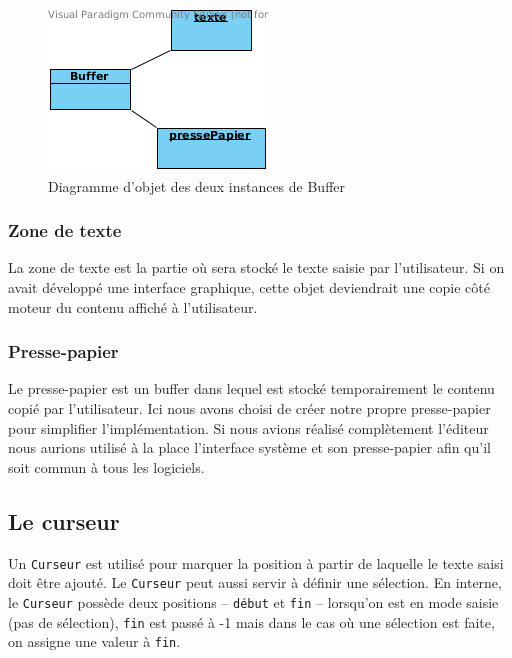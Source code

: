 \documentclass[french]{article}
\begin{document}
\begin{figure}[h!]
	\centering
	\includegraphics{buffer-texte-clipboard.png}
	\caption{Diagramme d'objet des deux instances de Buffer}
\end{figure}

\subsubsection{Zone de texte}\label{ssec:zone-texte}

La zone de texte est la partie où sera stocké le texte saisie par l'utilisateur. Si on avait développé une interface graphique, cette objet deviendrait une copie côté moteur du contenu affiché à l'utilisateur.

\subsubsection{Presse-papier}\label{ssec:presse-papier}

Le presse-papier est un buffer dans lequel est stocké temporairement le contenu copié par l'utilisateur. Ici nous avons choisi de créer notre propre presse-papier pour simplifier l'implémentation. Si nous avions réalisé complètement l'éditeur nous aurions utilisé à la place l'interface système et son presse-papier afin qu'il soit commun à tous les logiciels.

\subsection{Le curseur}\label{ssec:curseur}
Un \texttt{Curseur} est utilisé pour marquer la position à partir de laquelle le texte saisi doit être ajouté. Le \texttt{Curseur} peut aussi servir à définir une sélection. En interne, le \texttt{Curseur} possède deux positions -- \texttt{début} et \texttt{fin} -- lorsqu'on est en \og{}mode saisie\fg{} (pas de sélection), \texttt{fin} est passé à -1 mais dans le cas où une sélection est faite, on assigne une valeur à \texttt{fin}.
\end{document}

